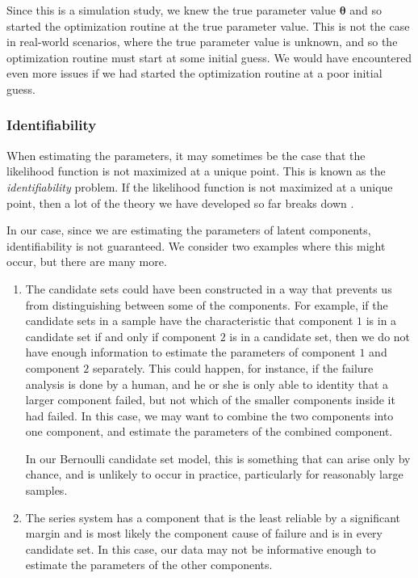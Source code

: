 \documentclass[
]{article}
\begin{document}
Since this is a simulation study, we knew the true parameter value
\(\boldsymbol{\theta}\) and so started the optimization routine at the
true parameter value. This is not the case in real-world scenarios,
where the true parameter value is unknown, and so the optimization
routine must start at some initial guess. We would have encountered even
more issues if we had started the optimization routine at a poor initial
guess.

\hypertarget{identifiability}{%
\subsubsection*{Identifiability}\label{identifiability}}

When estimating the parameters, it may sometimes be the case that the
likelihood function is not maximized at a unique point. This is known as
the \emph{identifiability} problem. If the likelihood function is not
maximized at a unique point, then a lot of the theory we have developed
so far breaks down \citep{mclachlan2007algorithm}.

In our case, since we are estimating the parameters of latent
components, identifiability is not guaranteed. We consider two examples
where this might occur, but there are many more.

\begin{enumerate}
\def\labelenumi{\arabic{enumi}.}
\item
  The candidate sets could have been constructed in a way that prevents
  us from distinguishing between some of the components. For example, if
  the candidate sets in a sample have the characteristic that component
  \(1\) is in a candidate set if and only if component \(2\) is in a
  candidate set, then we do not have enough information to estimate the
  parameters of component \(1\) and component \(2\) separately. This
  could happen, for instance, if the failure analysis is done by a
  human, and he or she is only able to identity that a larger component
  failed, but not which of the smaller components inside it had failed.
  In this case, we may want to combine the two components into one
  component, and estimate the parameters of the combined component.

  In our Bernoulli candidate set model, this is something that can arise
  only by chance, and is unlikely to occur in practice, particularly for
  reasonably large samples.
\item
  The series system has a component that is the least reliable by a
  significant margin and is most likely the component cause of failure
  and is in every candidate set. In this case, our data may not be
  informative enough to estimate the parameters of the other components.
\end{enumerate}
\end{document}
